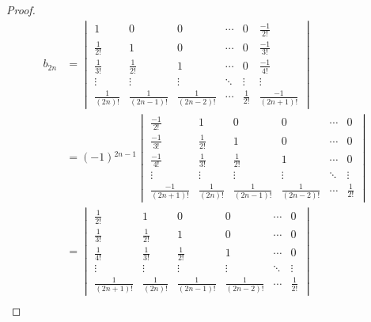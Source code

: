 \documentclass[class=linear-algebra,crop=false]{standalone}
\begin{document}
\begin{proof}
	\begingroup{}
	\allowdisplaybreaks{}
	\begin{align*}
		b_{2n} & =
		\begin{vmatrix}
			1               & 0                 & 0                 & \cdots & 0            & \frac{-1}{2!}      \\
			\frac{1}{2!}    & 1                 & 0                 & \cdots & 0            & \frac{-1}{3!}      \\
			\frac{1}{3!}    & \frac{1}{2!}      & 1                 & \cdots & 0            & \frac{-1}{4!}      \\
			\vdots          & \vdots            & \vdots            & \ddots & \vdots       & \vdots             \\
			\frac{1}{(2n)!} & \frac{1}{(2n-1)!} & \frac{1}{(2n-2)!} & \cdots & \frac{1}{2!} & \frac{-1}{(2n+1)!}
		\end{vmatrix} \\
		       & = (-1){}^{2n-1}
		\begin{vmatrix}
			\frac{-1}{2!}      & 1               & 0                 & 0                 & \cdots & 0            \\
			\frac{-1}{3!}      & \frac{1}{2!}    & 1                 & 0                 & \cdots & 0            \\
			\frac{-1}{4!}      & \frac{1}{3!}    & \frac{1}{2!}      & 1                 & \cdots & 0            \\
			\vdots             & \vdots          & \vdots            & \vdots            & \ddots & \vdots       \\
			\frac{-1}{(2n+1)!} & \frac{1}{(2n)!} & \frac{1}{(2n-1)!} & \frac{1}{(2n-2)!} & \cdots & \frac{1}{2!}
		\end{vmatrix} \\
		       & =
		\begin{vmatrix}
			\frac{1}{2!}      & 1               & 0                 & 0                 & \cdots & 0            \\
			\frac{1}{3!}      & \frac{1}{2!}    & 1                 & 0                 & \cdots & 0            \\
			\frac{1}{4!}      & \frac{1}{3!}    & \frac{1}{2!}      & 1                 & \cdots & 0            \\
			\vdots            & \vdots          & \vdots            & \vdots            & \ddots & \vdots       \\
			\frac{1}{(2n+1)!} & \frac{1}{(2n)!} & \frac{1}{(2n-1)!} & \frac{1}{(2n-2)!} & \cdots & \frac{1}{2!}
		\end{vmatrix}  \\

\end{align*}
\end{proof}
\end{document}
